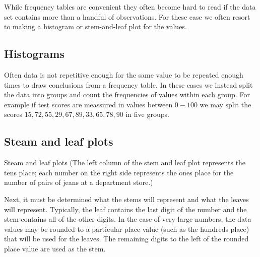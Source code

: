 While frequency tables are convenient they often become hard to read if the data set contains more than a handful of observations. For these case we often resort to making a histogram or stem-and-leaf plot for the values.

\subsection{Histograms}
Often data is not repetitive enough for the same value to be repeated enough times to draw conclusions from a frequency table. In these cases we instead split the data into groups and count the frequencies of values within each group. For example if test scores are meassured in values between $0-100$ we may split the scores $15, 72, 55, 29, 67, 89, 33, 65, 78, 90$ in five groups.
\begin{figure}[H]
\centering
{}
\end{figure}

\subsection{Steam and leaf plots}
Steam and leaf plots (The left column of the stem and leaf plot represents the tens place; each number on the right side represents the ones place for the number of pairs of jeans at a department store.)

Next, it must be determined what the stems will represent and what the leaves will represent. Typically, the leaf contains the last digit of the number and the stem contains all of the other digits. In the case of very large numbers, the data values may be rounded to a particular place value (such as the hundreds place) that will be used for the leaves. The remaining digits to the left of the rounded place value are used as the stem.

